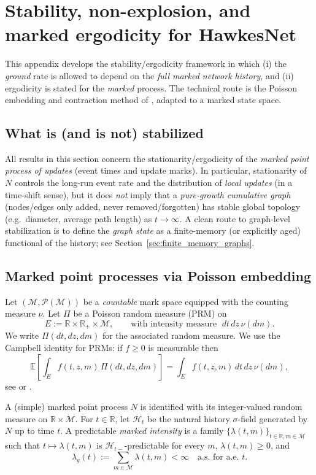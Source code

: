 \documentclass[12pt]{article}
\begin{document}
\section{Stability, non-explosion, and marked ergodicity for HawkesNet}
\label{sec:stability_theory}

This appendix develops the stability/ergodicity framework in which (i) the \emph{ground} rate is allowed to depend on the \emph{full marked network history}, and (ii) ergodicity is stated for the \emph{marked} process. The technical route is the Poisson embedding and contraction method of \citep{bremaud1996stability}, adapted to a marked state space.

\subsection{What is (and is not) stabilized}

All results in this section concern the stationarity/ergodicity of the \emph{marked point process of updates} (event times and update marks). In particular, stationarity of $N$ controls the long-run event rate and the distribution of \emph{local updates} (in a time-shift sense), but it does \emph{not} imply that a \emph{pure-growth cumulative graph} (nodes/edges only added, never removed/forgotten) has stable global topology (e.g.\ diameter, average path length) as $t\to\infty$. A clean route to graph-level stabilization is to define the \emph{graph state} as a finite-memory (or explicitly aged) functional of the history; see Section~\ref{sec:finite_memory_graphs}.

\subsection{Marked point processes via Poisson embedding}

Let $(\mathcal M,\mathcal P(\mathcal M))$ be a \emph{countable} mark space equipped with the counting measure $\nu$.
Let $\Pi$ be a Poisson random measure (PRM) on
\[
E := \mathbb R \times \mathbb R_+ \times \mathcal M,
\qquad
\text{with intensity measure } \; dt \, dz \, \nu(dm).
\]
We write $\Pi(dt,dz,dm)$ for the associated random measure. We use the Campbell identity for PRMs: if $f\ge 0$ is measurable then
\[
\mathbb E\!\left[\int_E f(t,z,m)\,\Pi(dt,dz,dm)\right]
=
\int_E f(t,z,m)\,dt\,dz\,\nu(dm),
\]
see \citep[Ch.~10]{daley2003introduction} or \citep[Ch.~II]{daley2007introduction}.

A (simple) marked point process $N$ is identified with its integer-valued random measure on $\mathbb R\times\mathcal M$.
For $t\in\mathbb R$, let $\mathcal H_t$ be the natural history $\sigma$-field generated by $N$ up to time $t$.
A predictable \emph{marked intensity} is a family $\{\lambda(t,m)\}_{t\in\mathbb R,m\in\mathcal M}$ such that
$t\mapsto \lambda(t,m)$ is $\mathcal H_{t-}$-predictable for every $m$, $\lambda(t,m)\ge 0$, and
\[
\lambda_g(t) := \sum_{m\in\mathcal M}\lambda(t,m) < \infty
\quad\text{a.s. for a.e. }t.
\]
\end{document}
